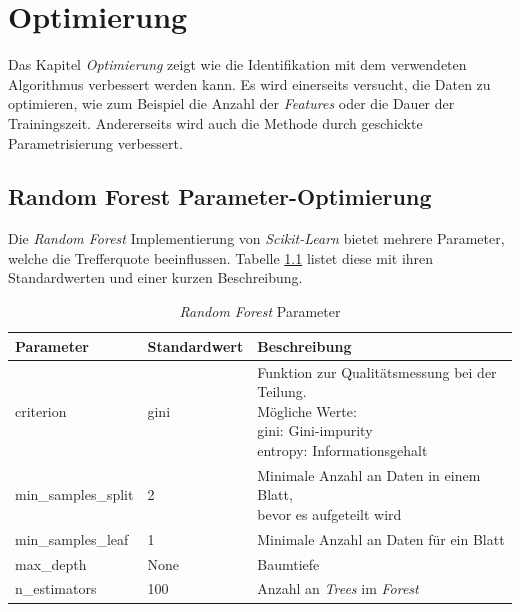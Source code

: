 %
%
%
%
%


\chapter{Optimierung}
\label{chap:optimization}

Das Kapitel \textit{Optimierung} zeigt wie die Identifikation mit dem verwendeten Algorithmus verbessert werden kann. Es wird einerseits versucht, die Daten zu optimieren, wie zum Beispiel die Anzahl der \textit{Features} oder die Dauer der Trainingszeit. Andererseits wird auch die Methode durch geschickte Parametrisierung verbessert.

\section{Random Forest Parameter-Optimierung}
\label{sec:ml_optimization}

Die \textit{Random Forest} Implementierung von \textit{Scikit-Learn} bietet mehrere Parameter, welche die Trefferquote beeinflussen. Tabelle \ref{tab:rf_parameter} listet diese mit ihren Standardwerten und einer kurzen Beschreibung.

\begin{table}[htbp]
  \centering
  \caption{\textit{Random Forest} Parameter \cite{sklearn_api}}
  \label{tab:rf_parameter}
  \begin{tabular}{|l|l|l|}
  \hline
  Parameter & Standardwert & Beschreibung\\
  \hline
  criterion & gini & \shortstack{Funktion zur Qualitätsmessung bei der Teilung.\\Mögliche Werte: \\gini: Gini-impurity \\entropy: Informationsgehalt} \\
  min\_samples\_split & 2 & \shortstack{Minimale Anzahl an Daten in einem Blatt,\\bevor es aufgeteilt wird} \\
  min\_samples\_leaf & 1 & Minimale Anzahl an Daten für ein Blatt \\
  max\_depth & None & Baumtiefe \\
  n\_estimators & 100 & Anzahl an \textit{Trees} im \textit{Forest}\\
  \hline
\end{tabular}
\end{table}


